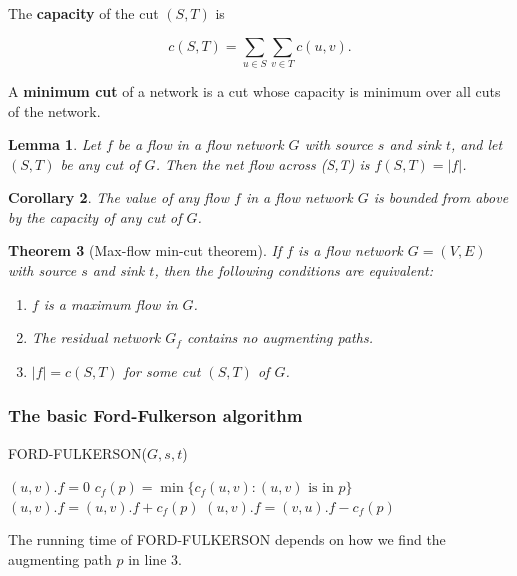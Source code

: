 \documentclass[12pt]{article}
\newtheorem{theorem}{Theorem}
\newtheorem{lemma}[theorem]{Lemma}
\newtheorem{corollary}[theorem]{Corollary}
\begin{document}
The \textbf{capacity} of the cut $(S,T)$ is

\begin{equation*}
  c(S,T) = \sum_{u \in S} \sum_{v \in T} c(u,v).
\end{equation*}

A \textbf{minimum cut} of a network is a cut whose capacity is minimum over all cuts of the network.

\begin{lemma}
  Let $f$ be a flow in a flow network $G$ with source $s$ and sink $t$, and let $(S,T)$ be any cut of $G$. Then the net flow across (S,T) is $f(S,T) = |f|$.
\end{lemma}

\begin{corollary}
  The value of any flow $f$ in a flow network $G$ is bounded from above by the capacity of any cut of $G$.
\end{corollary}

\begin{theorem} [Max-flow min-cut theorem]
  If $f$ is a flow network $G = (V,E)$ with source $s$ and sink $t$, then the following conditions are equivalent:
  \begin{enumerate}
    \item $f$ is a maximum flow in $G$.
    \item The residual network $G_f$ contains no augmenting paths.
    \item $|f| = c(S,T)$ for some cut $(S,T)$ of $G$.
  \end{enumerate}
\end{theorem}

\subsubsection*{The basic Ford-Fulkerson algorithm}

FORD-FULKERSON($G, s, t$)
\begin{algorithmic} [1]
	\State $(u, v).f = 0$
\EndFor
{}
	\State $c_f(p) = \min \{ c_f(u,v) : (u,v) \text{ is in } p \}$
			\State $(u,v).f = (u,v).f + c_f(p)$
                \Else
			\State $(u,v).f = (v,u).f - c_f(p)$
                \EndIf
        \EndFor
\EndWhile
\end{algorithmic}

The running time of FORD-FULKERSON depends on how we find the augmenting path $p$ in line 3.
\end{document}
